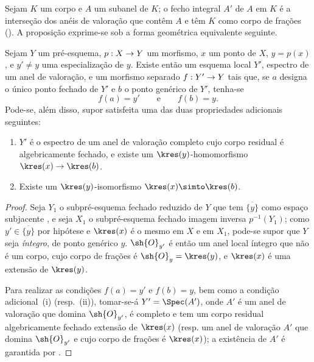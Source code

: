 \documentclass[oneside,10pt]{amsart}
\makeatletter
\newcommand{\ega@arrow}[2]{\mathchoice{#1}{#2}{#2}{#2}}
\renewcommand{\to}{\ega@arrow{\longrightarrow}{\rightarrow}}
\let\EGAOriginalLabel\label
\renewcommand{\label}[1]{\phantomsection\EGAOriginalLabel{#1}}
\makeatother
\begin{document}
\begin{env}[7.1.3]
\label{II.7.1.3}
Sejam $K$ um corpo e $A$ um subanel de $K$;
o fecho integral $A'$ de $A$ em $K$ é a interseção dos anéis de valoração que contêm $A$ e têm $K$ como corpo de frações (\cite[p.~51, th.~2]{I-11}).
A proposição  exprime-se sob a forma geométrica equivalente seguinte.
\end{env}

\begin{proposition}[7.1.4]
\label{II.7.1.4}
Sejam $Y$ um pré-esquema, $p:X\to Y$ um morfismo, $x$ um ponto de $X$, $y=p(x)$, e $y'\neq y$ uma especialização  de $y$.
Existe então um esquema local $Y'$, espectro de um anel de valoração, e um morfismo separado $f:Y'\to Y$ tais que, se $a$ designa o único ponto fechado de $Y'$ e $b$ o ponto genérico de $Y'$, tenha-se
\[
  f(a)=y'
  \qquad\text{e}\qquad
  f(b)=y.
\]
Pode-se, além disso, supor satisfeita uma das duas propriedades adicionais seguintes:
\begin{enumerate}
  \item[\rm{(i)}] $Y'$ é o espectro de um anel de valoração completo cujo corpo residual é algebricamente fechado, e existe um $\kres(y)$-homomorfismo $\kres(x)\to\kres(b)$.
  \item[\rm{(ii)}] Existe um $\kres(y)$-isomorfismo $\kres(x)\simto\kres(b)$.
\end{enumerate}
\end{proposition}

\begin{proof}
Seja $Y_1$ o subpré-esquema fechado reduzido de $Y$ que tem $\overline{\{y\}}$ como espaço subjacente , e seja $X_1$ o subpré-esquema fechado imagem inversa $p^{-1}(Y_1)$;
como $y'\in\overline{\{y\}}$ por hipótese e $\kres(x)$ é o mesmo em $X$ e em $X_1$, pode-se supor que $Y$ seja \emph{íntegro}, de ponto genérico $y$.
$\sh{O}_{y'}$ é então um anel local íntegro que não é um corpo, cujo corpo de frações é $\sh{O}_y=\kres(y)$, e $\kres(x)$ é uma extensão de $\kres(y)$.

Para realizar as condições $f(a)=y'$ e $f(b)=y$, bem como a condição adicional~(i) (resp.~(ii)), tomar-se-á $Y'=\Spec(A')$, onde $A'$ é um anel de valoração que domina $\sh{O}_{y'}$, é completo e tem um corpo residual algebricamente fechado extensão de $\kres(x)$ (resp. um anel de valoração $A'$ que domina $\sh{O}_{y'}$ e cujo corpo de frações é $\kres(x)$);
a existência de $A'$ é garantida por .
\end{proof}
\end{document}
